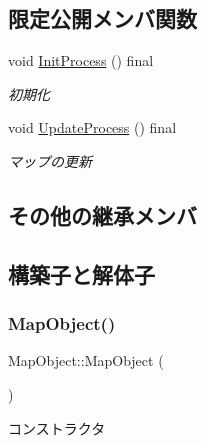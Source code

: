 \subsection*{限定公開メンバ関数}
\begin{DoxyCompactItemize}
\item 
void \mbox{\hyperlink{class_map_object_a3043cddb8aaad0eab27a076e9bee0284}{Init\+Process}} () final
\begin{DoxyCompactList}\small\item\em 初期化 \end{DoxyCompactList}\item 
void \mbox{\hyperlink{class_map_object_ab6b8849f15175417eca94b2703945e4b}{Update\+Process}} () final
\begin{DoxyCompactList}\small\item\em マップの更新 \end{DoxyCompactList}\end{DoxyCompactItemize}
\subsection*{その他の継承メンバ}


\subsection{構築子と解体子}
\mbox{\label{class_map_object_a568754515cc72ce0861d30c3040d26d2}} 
\subsubsection{\texorpdfstring{Map\+Object()}{MapObject()}\hspace{0.1cm}{\footnotesize\ttfamily [1/2]}}
{\footnotesize\ttfamily Map\+Object\+::\+Map\+Object (\begin{DoxyParamCaption}{ }\end{DoxyParamCaption})\hspace{0.3cm}{\ttfamily [inline]}}



コンストラクタ 

\mbox{\label{class_map_object_aae3a8a07e453e38a58b01e2eea16a76a}} 
